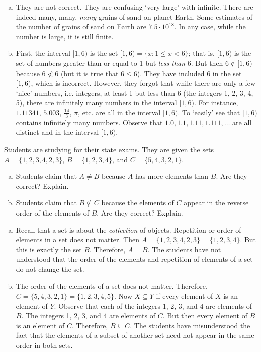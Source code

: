\documentclass[11pt,letterpaper]{article}
\begin{document}
\sol 
\begin{enumerate}[(a)]
\item They are not correct. They are confusing `very large' with infinite. There are indeed many, many, \textit{many} grains of sand on planet Earth. Some estimates of the number of grains of sand on Earth are $7.5 \cdot 10^{18}$. In any case, while the number is large, it is still finite. \pspace

\item First, the interval $[1, 6)$ is the set $[1, 6)= \{ x \colon 1 \leq x < 6 \}$; that is, $[1, 6)$ is the set of numbers greater than or equal to 1 but \textit{less than} 6. But then $6 \notin [1, 6)$ because $6 \not< 6$ (but it is true that $6 \leq 6$). They have included 6 in the set $[1, 6)$, which is incorrect. However, they forgot that while there are only a few `nice' numbers, i.e. integers, at least 1 but less than 6 (the integers 1, 2, 3, 4, 5), there are infinitely many numbers in the interval $[1, 6)$. For instance, $1.11341$, $5.003$, $\frac{14}{3}$, $\pi$, etc. are all in the interval $[1, 6)$. To `easily' see that $[1, 6)$ contains infinitely many numbers. Observe that $1.0, 1.1, 1.11, 1.111, \ldots$ are all distinct and in the interval $[1, 6)$. 
\end{enumerate}



\newpage



 Students are studying for their state exams. They are given the sets $A= \{ 1, 2, 3, 4, 2, 3 \}$, $B= \{ 1, 2, 3, 4 \}$, and $C= \{ 5, 4, 3, 2, 1 \}$. 
	\begin{enumerate}[(a)]
	\item Students claim that $A \neq B$ because $A$ has more elements than $B$. Are they correct? Explain. 
	\item Students claim that $B \not\subseteq C$ because the elements of $C$ appear in the reverse order of the elements of $B$. Are they correct? Explain. 
	\end{enumerate} \pspace

\sol 
\begin{enumerate}[(a)]
\item Recall that a set is about the \textit{collection} of objects. Repetition or order of elements in a set does not matter. Then $A= \{ 1, 2, 3, 4, 2, 3 \}= \{ 1, 2, 3, 4 \}$. But this is exactly the set $B$. Therefore, $A= B$. The students have not understood that the order of the elements and repetition of elements of a set do not change the set. \pspace

\item The order of the elements of a set does not matter. Therefore, $C= \{ 5, 4, 3, 2, 1 \}= \{ 1, 2, 3, 4, 5 \}$. Now $X \subseteq Y$ if every element of $X$ is an element of $Y$. Observe that each of the integers 1, 2, 3, and 4 are elements of $B$. The integers 1, 2, 3, and 4 are elements of $C$. But then every element of $B$ is an element of $C$. Therefore, $B \subseteq C$. The students have misunderstood the fact that the elements of a subset of another set need not appear in the same order in both sets. 
\end{enumerate}
\end{document}

